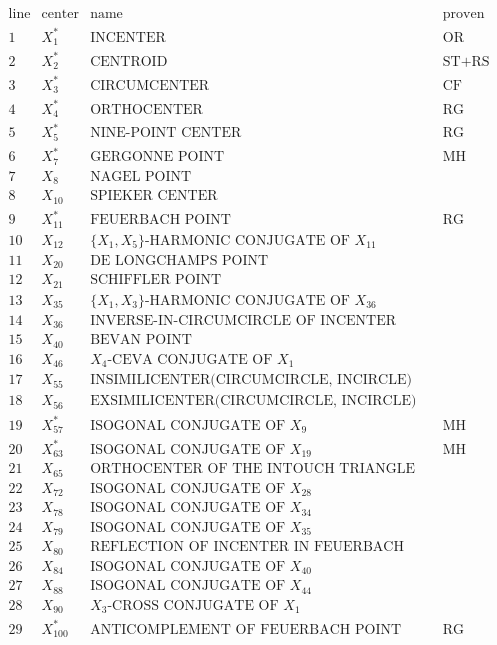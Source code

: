 \documentclass[]{article}
\begin{document}
\[
\begin{array}{clll}
\text{line} & \text{center} & \text{name} & \text{proven by} \\
\hline
 1 & X_{1}^* & \text{INCENTER} & \text{OR} \\
 2 & X_{2}^* & \text{CENTROID} & \text{ST+RS} \\
 3 & X_{3}^* & \text{CIRCUMCENTER} & \text{CF} \\
 4 & X_{4}^* & \text{ORTHOCENTER} & \text{RG} \\
 5 & X_{5}^* & \text{NINE-POINT CENTER} & \text{RG} \\
 6 & X_{7}^* & \text{GERGONNE POINT} & \text{MH} \\
 7 & X_{8} & \text{NAGEL POINT} & \\
 8 & X_{10} & \text{SPIEKER CENTER} & \\
 9 & X_{11}^* & \text{FEUERBACH POINT} & \text{RG} \\
 10 & X_{12} & \text{$\{X_{1},X_{5}\}$-HARMONIC CONJUGATE OF $X_{11}$} & \\
 11 & X_{20} & \text{DE LONGCHAMPS POINT} & \\
 12 & X_{21} & \text{SCHIFFLER POINT} & \\
 13 & X_{35} & \text{$\{X_{1},X_{3}\}$-HARMONIC CONJUGATE OF $X_{36}$} & \\
 14 & X_{36} & \text{INVERSE-IN-CIRCUMCIRCLE OF INCENTER} & \\
 15 & X_{40} & \text{BEVAN POINT} & \\
 16 & X_{46} & \text{$X_{4}$-CEVA CONJUGATE OF $X_{1}$} & \\
 17 & X_{55} & \text{INSIMILICENTER(CIRCUMCIRCLE, INCIRCLE)} & \\
 18 & X_{56} & \text{EXSIMILICENTER(CIRCUMCIRCLE, INCIRCLE)} & \\
 19 & X_{57}^* & \text{ISOGONAL CONJUGATE OF $X_{9}$} & \text{MH} \\
 20 & X_{63}^* & \text{ISOGONAL CONJUGATE OF $X_{19}$} & \text{MH} \\
 21 & X_{65} & \text{ORTHOCENTER OF THE INTOUCH TRIANGLE} & \\
 22 & X_{72} & \text{ISOGONAL CONJUGATE OF $X_{28}$} & \\
 23 & X_{78} & \text{ISOGONAL CONJUGATE OF $X_{34}$} & \\
 24 & X_{79} & \text{ISOGONAL CONJUGATE OF $X_{35}$} & \\
 25 & X_{80} & \text{REFLECTION OF INCENTER IN FEUERBACH POINT} & \\
 26 & X_{84} & \text{ISOGONAL CONJUGATE OF $X_{40}$} & \\
 27 & X_{88} & \text{ISOGONAL CONJUGATE OF $X_{44}$} & \\
 28 & X_{90} & \text{$X_{3}$-CROSS CONJUGATE OF $X_{1}$} & \\
 29 & X_{100}^* & \text{ANTICOMPLEMENT OF FEUERBACH POINT} & \text{RG} \\
\end{array}
\]
\end{document}
